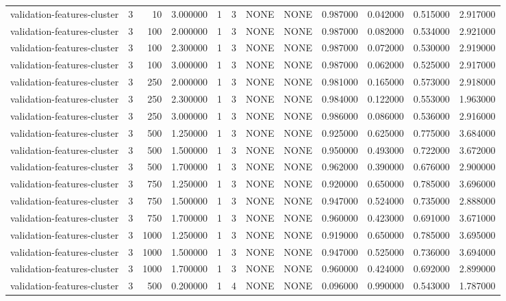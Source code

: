 \begin{tabular}{lrrrllllrrrr}
validation-features-cluster & 3 & 10 & 3.000000 & 1 & 3 & NONE & NONE & 0.987000 & 0.042000 & 0.515000 & 2.917000 \\
validation-features-cluster & 3 & 100 & 2.000000 & 1 & 3 & NONE & NONE & 0.987000 & 0.082000 & 0.534000 & 2.921000 \\
validation-features-cluster & 3 & 100 & 2.300000 & 1 & 3 & NONE & NONE & 0.987000 & 0.072000 & 0.530000 & 2.919000 \\
validation-features-cluster & 3 & 100 & 3.000000 & 1 & 3 & NONE & NONE & 0.987000 & 0.062000 & 0.525000 & 2.917000 \\
validation-features-cluster & 3 & 250 & 2.000000 & 1 & 3 & NONE & NONE & 0.981000 & 0.165000 & 0.573000 & 2.918000 \\
validation-features-cluster & 3 & 250 & 2.300000 & 1 & 3 & NONE & NONE & 0.984000 & 0.122000 & 0.553000 & 1.963000 \\
validation-features-cluster & 3 & 250 & 3.000000 & 1 & 3 & NONE & NONE & 0.986000 & 0.086000 & 0.536000 & 2.916000 \\
validation-features-cluster & 3 & 500 & 1.250000 & 1 & 3 & NONE & NONE & 0.925000 & 0.625000 & 0.775000 & 3.684000 \\
validation-features-cluster & 3 & 500 & 1.500000 & 1 & 3 & NONE & NONE & 0.950000 & 0.493000 & 0.722000 & 3.672000 \\
validation-features-cluster & 3 & 500 & 1.700000 & 1 & 3 & NONE & NONE & 0.962000 & 0.390000 & 0.676000 & 2.900000 \\
validation-features-cluster & 3 & 750 & 1.250000 & 1 & 3 & NONE & NONE & 0.920000 & 0.650000 & 0.785000 & 3.696000 \\
validation-features-cluster & 3 & 750 & 1.500000 & 1 & 3 & NONE & NONE & 0.947000 & 0.524000 & 0.735000 & 2.888000 \\
validation-features-cluster & 3 & 750 & 1.700000 & 1 & 3 & NONE & NONE & 0.960000 & 0.423000 & 0.691000 & 3.671000 \\
validation-features-cluster & 3 & 1000 & 1.250000 & 1 & 3 & NONE & NONE & 0.919000 & 0.650000 & 0.785000 & 3.695000 \\
validation-features-cluster & 3 & 1000 & 1.500000 & 1 & 3 & NONE & NONE & 0.947000 & 0.525000 & 0.736000 & 3.694000 \\
validation-features-cluster & 3 & 1000 & 1.700000 & 1 & 3 & NONE & NONE & 0.960000 & 0.424000 & 0.692000 & 2.899000 \\
validation-features-cluster & 3 & 500 & 0.200000 & 1 & 4 & NONE & NONE & 0.096000 & 0.990000 & 0.543000 & 1.787000 \\

\end{tabular}
